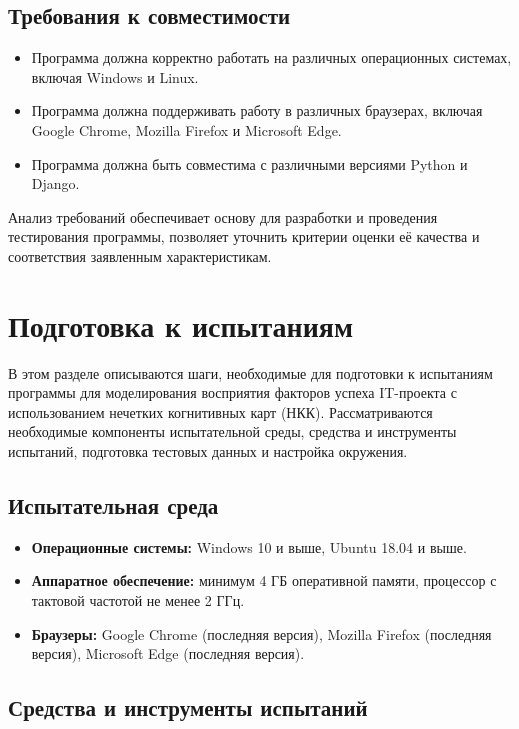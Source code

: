 \documentclass{article}
\begin{document}
    \subsection{Требования к совместимости}

    \begin{itemize}
        \item Программа должна корректно работать на различных операционных системах, включая Windows и Linux.
        \item Программа должна поддерживать работу в различных браузерах, включая Google Chrome, Mozilla Firefox и Microsoft Edge.
        \item Программа должна быть совместима с различными версиями Python и Django.
    \end{itemize}

    Анализ требований обеспечивает основу для разработки и проведения тестирования программы, позволяет уточнить критерии оценки её качества и соответствия заявленным характеристикам.
    \newpage
    \section{Подготовка к испытаниям}

    В этом разделе описываются шаги, необходимые для подготовки к испытаниям программы для моделирования восприятия факторов успеха IT-проекта с использованием нечетких когнитивных карт (НКК). Рассматриваются необходимые компоненты испытательной среды, средства и инструменты испытаний, подготовка тестовых данных и настройка окружения.

    \subsection{Испытательная среда}

    \begin{itemize}
        \item \textbf{Операционные системы:} Windows 10 и выше, Ubuntu 18.04 и выше.
        \item \textbf{Аппаратное обеспечение:} минимум 4 ГБ оперативной памяти, процессор с тактовой частотой не менее 2 ГГц.
        \item \textbf{Браузеры:} Google Chrome (последняя версия), Mozilla Firefox (последняя версия), Microsoft Edge (последняя версия).
    \end{itemize}

    \subsection{Средства и инструменты испытаний}
\end{document}
